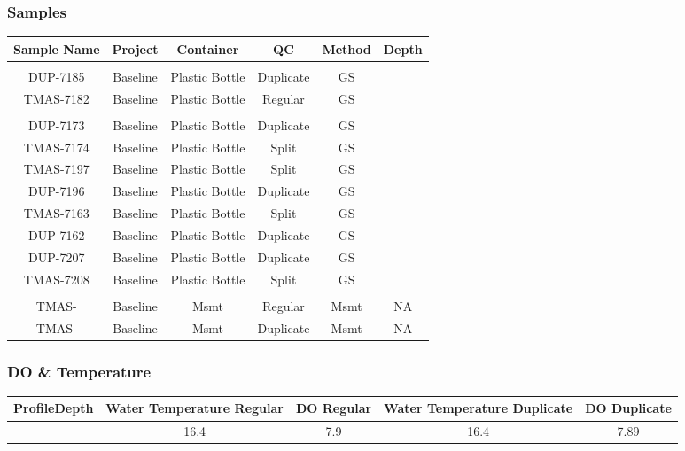 \documentclass[
  letterpaper,
  DIV=11,
  numbers=noendperiod]{scrartcl}
\begin{document}
\subsubsection{Samples}

\begin{longtable*}{cccccc}
\toprule
Sample Name & Project & Container & QC & Method & Depth \\ 
\midrule\addlinespace[2.5pt]
 \\ 
\midrule\addlinespace[2.5pt]
DUP-7185 & Baseline & Plastic Bottle & Duplicate & GS &  \\ 
TMAS-7182 & Baseline & Plastic Bottle & Regular & GS &  \\ 
\midrule\addlinespace[2.5pt]
 \\ 
\midrule\addlinespace[2.5pt]
DUP-7173 & Baseline & Plastic Bottle & Duplicate & GS &  \\ 
TMAS-7174 & Baseline & Plastic Bottle & Split & GS &  \\ 
TMAS-7197 & Baseline & Plastic Bottle & Split & GS &  \\ 
DUP-7196 & Baseline & Plastic Bottle & Duplicate & GS &  \\ 
TMAS-7163 & Baseline & Plastic Bottle & Split & GS &  \\ 
DUP-7162 & Baseline & Plastic Bottle & Duplicate & GS &  \\ 
DUP-7207 & Baseline & Plastic Bottle & Duplicate & GS &  \\ 
TMAS-7208 & Baseline & Plastic Bottle & Split & GS &  \\ 
\midrule\addlinespace[2.5pt]
 \\ 
\midrule\addlinespace[2.5pt]
TMAS- & Baseline & Msmt & Regular & Msmt & NA \\ 
TMAS- & Baseline & Msmt & Duplicate & Msmt & NA \\ 
\bottomrule
\end{longtable*}

\subsubsection{DO \& Temperature}

\begin{longtable*}{rcccc}
\toprule
ProfileDepth & Water Temperature Regular & DO Regular & Water Temperature Duplicate & DO Duplicate \\ 
\midrule{} & 16.4 & 7.9 & 16.4 & 7.89 \\ 
\bottomrule
\end{longtable*}
\end{document}

